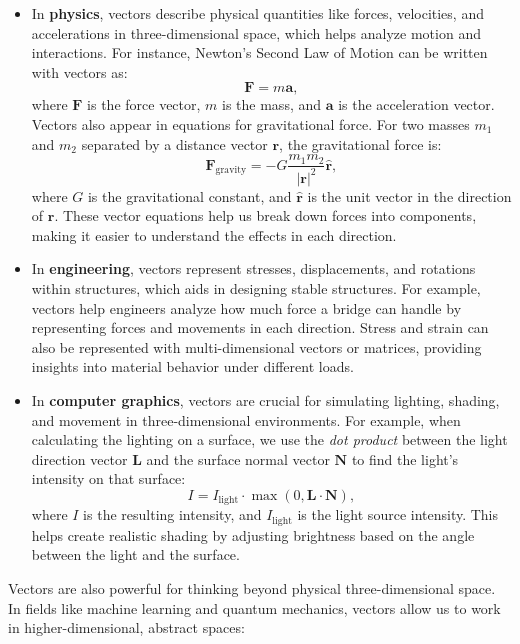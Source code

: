 \begin{itemize}
    \item In \textbf{physics}, vectors describe physical quantities like forces, velocities, and accelerations in three-dimensional space, which helps analyze motion and interactions. For instance, Newton’s Second Law of Motion can be written with vectors as:
    \[
    \mathbf{F} = m \mathbf{a},
    \]
    where \( \mathbf{F} \) is the force vector, \( m \) is the mass, and \( \mathbf{a} \) is the acceleration vector. Vectors also appear in equations for gravitational force. For two masses \( m_1 \) and \( m_2 \) separated by a distance vector \( \mathbf{r} \), the gravitational force is:
    \[
    \mathbf{F}_{\text{gravity}} = -G \frac{m_1 m_2}{|\mathbf{r}|^2} \hat{\mathbf{r}},
    \]
    where \( G \) is the gravitational constant, and \( \hat{\mathbf{r}} \) is the unit vector in the direction of \( \mathbf{r} \). These vector equations help us break down forces into components, making it easier to understand the effects in each direction.

    \item In \textbf{engineering}, vectors represent stresses, displacements, and rotations within structures, which aids in designing stable structures. For example, vectors help engineers analyze how much force a bridge can handle by representing forces and movements in each direction. Stress and strain can also be represented with multi-dimensional vectors or matrices, providing insights into material behavior under different loads.

    \item In \textbf{computer graphics}, vectors are crucial for simulating lighting, shading, and movement in three-dimensional environments. For example, when calculating the lighting on a surface, we use the \textit{dot product} between the light direction vector \( \mathbf{L} \) and the surface normal vector \( \mathbf{N} \) to find the light’s intensity on that surface:
    \[
    I = I_{\text{light}} \cdot \max(0, \mathbf{L} \cdot \mathbf{N}),
    \]
    where \( I \) is the resulting intensity, and \( I_{\text{light}} \) is the light source intensity. This helps create realistic shading by adjusting brightness based on the angle between the light and the surface.
\end{itemize}

\noindent Vectors are also powerful for thinking beyond physical three-dimensional space. In fields like machine learning and quantum mechanics, vectors allow us to work in higher-dimensional, abstract spaces:

